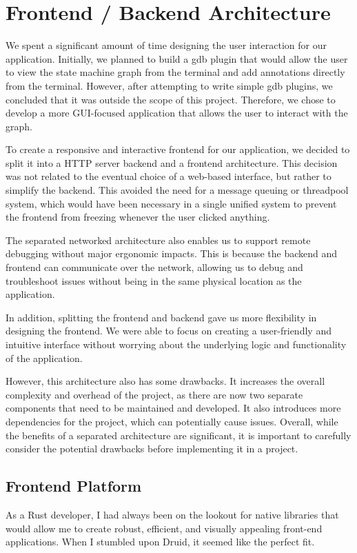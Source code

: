 \chapter{Frontend / Backend Architecture}
We spent a significant amount of time designing the user interaction for our application. Initially, we planned to build a gdb plugin that would allow the user to view the state machine graph from the terminal and add annotations directly from the terminal. However, after attempting to write simple gdb plugins, we concluded that it was outside the scope of this project. Therefore, we chose to develop a more GUI-focused application that allows the user to interact with the graph.

To create a responsive and interactive frontend for our application, we decided to split it into a HTTP server backend and a frontend architecture. This decision was not related to the eventual choice of a web-based interface, but rather to simplify the backend. This avoided the need for a message queuing or threadpool system, which would have been necessary in a single unified system to prevent the frontend from freezing whenever the user clicked anything.

The separated networked architecture also enables us to support remote debugging without major ergonomic impacts. This is because the backend and frontend can communicate over the network, allowing us to debug and troubleshoot issues without being in the same physical location as the application.

In addition, splitting the frontend and backend gave us more flexibility in designing the frontend. We were able to focus on creating a user-friendly and intuitive interface without worrying about the underlying logic and functionality of the application.

However, this architecture also has some drawbacks. It increases the overall complexity and overhead of the project, as there are now two separate components that need to be maintained and developed. It also introduces more dependencies for the project, which can potentially cause issues. Overall, while the benefits of a separated architecture are significant, it is important to carefully consider the potential drawbacks before implementing it in a project.

\section{Frontend Platform}
As a Rust developer, I had always been on the lookout for native libraries that would allow me to create robust, efficient, and visually appealing front-end applications. When I stumbled upon Druid, it seemed like the perfect fit.

